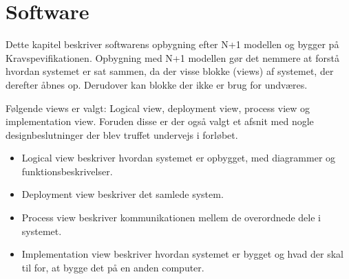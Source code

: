 \documentclass[Main]{subfiles}
\begin{document}
\chapter{Software}
Dette kapitel beskriver softwarens opbygning efter N+1 modellen\cite[p. 872-875]{Larman} og bygger på Kravspevifikationen\cite{KravSpec}. 
Opbygning med N+1 modellen gør det nemmere at forstå hvordan systemet er sat sammen, da der visse blokke (views) af systemet, der derefter åbnes op.
Derudover kan blokke der ikke er brug for undværes.

Følgende views er valgt:
Logical view, deployment view, process view og implementation view.
Foruden disse er der også valgt et afsnit med nogle designbeslutninger der blev truffet undervejs i forløbet.
\begin{itemize}
\item Logical view beskriver hvordan systemet er opbygget, med diagrammer og funktionsbeskrivelser.
\item Deployment view beskriver det samlede system.
\item Process view beskriver kommunikationen mellem de overordnede dele i systemet.
\item Implementation view beskriver hvordan systemet er bygget og hvad der skal til for, at bygge det på en anden computer.
\end{itemize}



\newpage


\newpage


\newpage


\newpage

\end{document}
